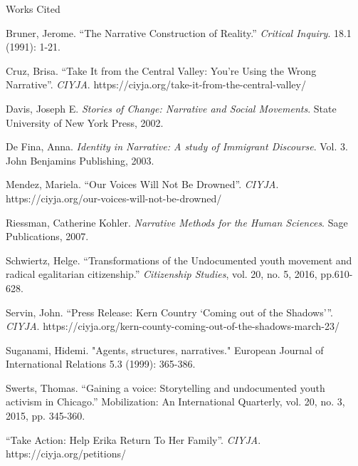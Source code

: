 \documentclass[12pt]{article}
\newcommand{\bibent}{\noindent \hangindent 40pt}
\newenvironment{workscited}{\newpage \begin{center} Works Cited \end{center}}{\newpage }
\begin{document}
\begin{flushleft}
\begin{workscited}

\bibent
Bruner, Jerome. ``The Narrative Construction of Reality.'' \textit{Critical Inquiry}. 18.1 (1991): 1-21.

\bibent
Cruz, Brisa. ``Take It from the Central Valley: You're Using the Wrong Narrative''. \textit{CIYJA}. https://ciyja.org/take-it-from-the-central-valley/

\bibent
Davis, Joseph E. \textit{Stories of Change: Narrative and Social Movements}. State University of New York Press, 2002.

\bibent
De Fina, Anna. \textit{Identity in Narrative: A study of Immigrant Discourse}. Vol. 3. John Benjamins Publishing, 2003.

\bibent
Mendez, Mariela. ``Our Voices Will Not Be Drowned''. \textit{CIYJA}. https://ciyja.org/our-voices-will-not-be-drowned/

\bibent
Riessman, Catherine Kohler. \textit{Narrative Methods for the Human Sciences}. Sage Publications, 2007.

\bibent
Schwiertz, Helge. ``Transformations of the Undocumented youth movement and radical egalitarian citizenship.'' \textit{Citizenship Studies}, vol. 20, no. 5, 2016, pp.610-628.

\bibent
Servin, John. ``Press Release: Kern Country `Coming out of the Shadows'''. \textit{CIYJA}. https://ciyja.org/kern-county-coming-out-of-the-shadows-march-23/

\bibent
Suganami, Hidemi. "Agents, structures, narratives." European Journal of International Relations 5.3 (1999): 365-386.

\bibent
Swerts, Thomas. ``Gaining a voice: Storytelling and undocumented youth activism in Chicago.'' Mobilization: An International Quarterly, vol. 20, no. 3, 2015, pp. 345-360.

\bibent
``Take Action: Help Erika Return To Her Family''. \textit{CIYJA}. https://ciyja.org/petitions/
\end{workscited}

\end{flushleft}
\end{document}
